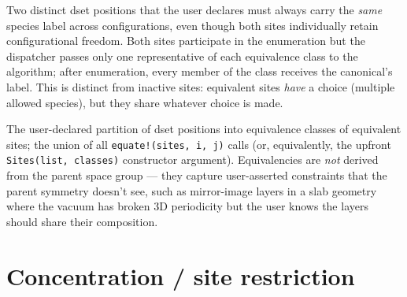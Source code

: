 \documentclass[11pt]{article}
\begin{document}
\begin{description}[leftmargin=2em, style=nextline]
\item[Equivalent sites]
Two distinct dset positions that the user declares must always carry the
\emph{same} species label across configurations, even though both
sites individually retain configurational freedom. Both sites
participate in the enumeration but the dispatcher passes only one
representative of each equivalence class to the algorithm; after
enumeration, every member of the class receives the canonical's label.
This is distinct from inactive sites: equivalent sites \emph{have} a
choice (multiple allowed species), but they share whatever choice is
made.

\item[Equivalencies]
The user-declared partition of dset positions into equivalence classes
of equivalent sites; the union of all \texttt{equate!(sites, i, j)}
calls (or, equivalently, the upfront \texttt{Sites(list, classes)}
constructor argument). Equivalencies are \emph{not} derived from the
parent space group --- they capture user-asserted constraints that the
parent symmetry doesn't see, such as mirror-image layers in a slab
geometry where the vacuum has broken 3D periodicity but the user knows
the layers should share their composition.
\end{description}

\section{Concentration / site restriction}
\end{document}
